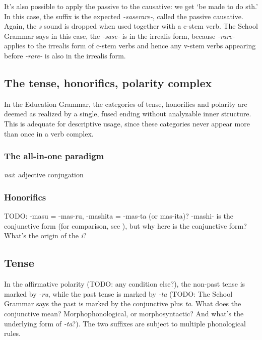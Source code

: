 \documentclass[UTF8, a4paper, oneside, scheme=plain]{ctexart}
\newcommand*{\citepage}[1]{pp.~{#1}}
\newcommand{\corpus}[1]{\emph{#1}}
\newcommand{\translate}[1]{`#1'}
\begin{document}
It's also possible to apply the passive to the causative:
we get \translate{be made to do sth.}
In this case, the suffix is the expected 
\corpus{-saserare-},
called the passive causative.
Again, the \corpus{s} sound is dropped when used together with a c-stem verb.
The School Grammar says in this case,
the \corpus{-sase-} is in the irrealis form,
because \corpus{-rare-} applies to the irrealis form of c-stem verbs 
and hence any v-stem verbs appearing before \corpus{-rare-} is also in the irrealis form.

\subsection{The tense, honorifics, polarity complex}

In the Education Grammar,
the categories of tense, honorifics and polarity 
are deemed as realized by a single, fused ending without analyzable inner structure.
This is adequate for descriptive usage,
since these categories never appear more than once in a verb complex.

\subsubsection{The all-in-one paradigm}



\corpus{nai}: adjective conjugation

\subsubsection{Honorifics}

TODO: -masu = -mas-ru, -mashita = -mas-ta (or mas-ita)?
-mashi- is the conjunctive form (for comparison, see \citet[\citepage{99}]{akiyama2012japanese}), but why here is the conjunctive form?
What's the origin of the \corpus{i}?

\subsection{Tense}

In the affirmative polarity (TODO: any condition else?),
the non-past tense is marked by \corpus{-ru},
while the past tense is marked by \corpus{-ta} (TODO: The School Grammar says the past is marked by the conjunctive plus \corpus{ta}. What does the conjunctive mean? Morphophonological, or morphosyntactic? And what's the underlying form of \corpus{-ta}?).
The two suffixes are subject to multiple phonological rules.
\end{document}
